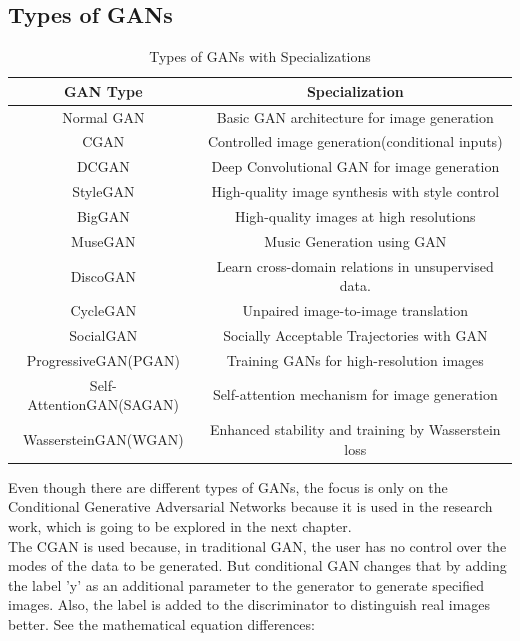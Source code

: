 \subsection{Types of GANs}

\begin{table}[h!]
    \centering
    \caption{Types of GANs with Specializations}
    \begin{tabular}{|c|c|}
    \hline
    \textbf{GAN Type} & \textbf{Specialization} \\ 
    \hline
    Normal GAN & Basic GAN architecture for image generation \\
    \hline
    CGAN & Controlled image generation(conditional inputs) \\
    \hline
    DCGAN & Deep Convolutional GAN for image generation \\
    \hline
    StyleGAN & High-quality image synthesis with style control \\
    \hline
    BigGAN\cite{BigGAN} & High-quality images at high resolutions\\
    \hline
    MuseGAN\cite{MuseGAN} & Music Generation using GAN \\
    \hline
    DiscoGAN\cite{DiscoGAN} & Learn cross-domain relations in unsupervised data.\\
    \hline
    CycleGAN\cite{CycleGAN} & Unpaired image-to-image translation \\
    \hline
    SocialGAN\cite{SocialGAN} & Socially Acceptable Trajectories with GAN \\
    \hline
    ProgressiveGAN(PGAN)\cite{PGAN} & Training GANs for high-resolution images \\
    \hline
    Self-AttentionGAN(SAGAN) & Self-attention mechanism for image generation \\
    \hline
    WassersteinGAN(WGAN)\cite{WGAN} & Enhanced stability and training by Wasserstein loss \\
    \hline
    \end{tabular}
\end{table}

\clearpage

\noindent
Even though there are different types of GANs, the focus is only on the Conditional Generative Adversarial Networks because it is used in the research work, which is going to be explored in the next chapter.\\

\noindent
The CGAN is used because, in traditional GAN, the user has no control over the modes of the data to be generated. But conditional GAN changes that by adding the label 'y' as an additional parameter to the generator to generate specified images. Also, the label is added to the discriminator to distinguish real images better. See the mathematical equation differences:

